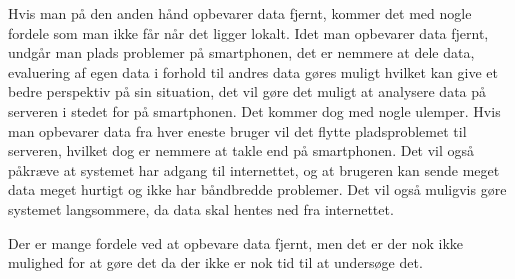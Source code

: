 Hvis man på den anden hånd opbevarer data fjernt, kommer det med nogle fordele som man ikke får når det ligger lokalt. Idet man opbevarer data fjernt, undgår man plads problemer på smartphonen, det er nemmere at dele data, evaluering af egen data i forhold til andres data gøres muligt hvilket kan give et bedre perspektiv på sin situation, det vil gøre det muligt at analysere data på serveren i stedet for på smartphonen. 
Det kommer dog med nogle ulemper. Hvis man opbevarer data fra hver eneste bruger vil det flytte pladsproblemet til serveren, hvilket dog er nemmere at takle end på smartphonen. Det vil også påkræve at systemet har adgang til internettet, og at brugeren kan sende meget data meget hurtigt og ikke har båndbredde problemer. Det vil også muligvis gøre systemet langsommere, da data skal hentes ned fra internettet.

Der er mange fordele ved at opbevare data fjernt, men det er der nok ikke mulighed for at gøre det da der ikke er nok tid til at undersøge det.



